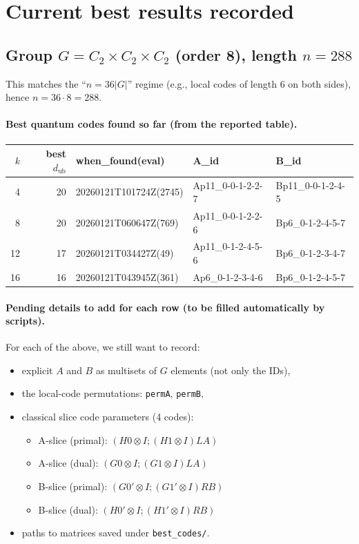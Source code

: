 \documentclass[11pt]{article}
\begin{document}
\section{Current best results recorded}

\subsection{Group $G = C_2 \times C_2 \times C_2$ (order 8), length $n=288$}
This matches the ``$n=36|G|$'' regime (e.g., local codes of length 6 on both sides), hence $n=36\cdot 8=288$.

\paragraph{Best quantum codes found so far (from the reported table).}
\begin{center}
\begin{tabular}{@{}r r l l l@{}}
\toprule
$k$ & best $d_{\mathrm{ub}}$ & when\_found(eval) & A\_id & B\_id \\
\midrule
4  & 20 & 20260121T101724Z(2745) & Ap11\_0-0-1-2-2-7 & Bp11\_0-0-1-2-4-5 \\
8  & 20 & 20260121T060647Z(769)  & Ap11\_0-0-1-2-2-6 & Bp6\_0-1-2-4-5-7 \\
12 & 17 & 20260121T034427Z(49)   & Ap11\_0-1-2-4-5-6 & Bp6\_0-1-2-3-4-7 \\
16 & 16 & 20260121T043945Z(361)  & Ap6\_0-1-2-3-4-6  & Bp6\_0-1-2-4-5-7 \\
\bottomrule
\end{tabular}
\end{center}

\paragraph{Pending details to add for each row (to be filled automatically by scripts).}
For each of the above, we still want to record:
\begin{itemize}
  \item explicit $A$ and $B$ as multisets of $G$ elements (not only the IDs),
  \item the local-code permutations: \texttt{permA}, \texttt{permB},
  \item classical slice code parameters (4 codes):
  \begin{itemize}
    \item A-slice (primal): $(H0 \otimes I; (H1 \otimes I)LA)$
    \item A-slice (dual): $(G0 \otimes I; (G1 \otimes I)LA)$
    \item B-slice (primal): $(G0' \otimes I; (G1' \otimes I)RB)$
    \item B-slice (dual): $(H0' \otimes I; (H1' \otimes I)RB)$
  \end{itemize}
  \item paths to matrices saved under \texttt{best\_codes/}.
\end{itemize}
\end{document}
